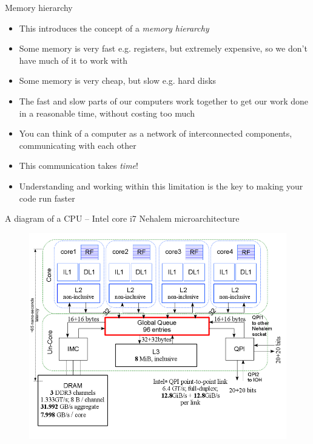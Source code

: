 \documentclass{beamer}
\begin{document}
\begin{frame}{Memory hierarchy}
	\begin{itemize}
		\item This introduces the concept of a \emph{memory hierarchy}
		\item Some memory is very fast e.g. registers, but extremely expensive,
		so we don't have much of it to work with
		\item Some memory is very cheap, but slow e.g. hard disks
		\item The fast and slow parts of our computers work together to get our
		work done in a reasonable time, without costing too much
		\item You can think of a computer as a network of interconnected components,
		communicating with each other
		\item This communication takes \emph{time}!
		\item Understanding and working within this limitation is the key to
		making your code run faster
	\end{itemize}
\end{frame}

\begin{frame}{A diagram of a CPU -- Intel core i7 Nehalem microarchitecture}
	\begin{figure}
		\includegraphics[scale=0.5]{Intel_core_i7.png}
	\end{figure}
\end{frame}
\end{document}
